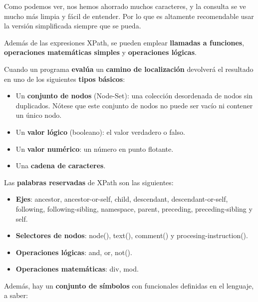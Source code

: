 Como podemos ver, nos hemos ahorrado muchos caracteres, y la consulta se ve mucho más limpia y fácil de entender. Por lo que es altamente recomendable usar la versión simplificada siempre que se pueda.

Además de las expresiones XPath, se pueden emplear \textbf{llamadas a funciones}, \textbf{operaciones matemáticas simples} y \textbf{operaciones lógicas}.

Cuando un programa \textbf{evalúa} un \textbf{camino de localización} devolverá el resultado en uno de los siguientes \textbf{tipos básicos}:

\begin{itemize}
    \item Un \textbf{conjunto de nodos} (Node-Set): una colección desordenada de nodos sin duplicados. Nótese que este conjunto de nodos no puede ser vacío ni contener un único nodo.
    \item Un \textbf{valor lógico} (booleano): el valor verdadero o falso.
    \item Un \textbf{valor numérico}: un número en punto flotante.
    \item Una \textbf{cadena de caracteres}.
\end{itemize}

Las \textbf{palabras reservadas} de XPath son las siguientes:

\begin{itemize}
    \item \textbf{Ejes}: ancestor, ancestor-or-self, child, descendant, descendant-or-self, following, following-sibling, namespace, parent, preceding, preceding-sibling y self.

    \item \textbf{Selectores de nodos}: node(), text(), comment() y procesing-instruction().
    \item \textbf{Operaciones lógicas}: and, or, not().
    \item \textbf{Operaciones matemáticas}: div, mod.
\end{itemize}

Además, hay un \textbf{conjunto de símbolos} con funcionales definidas en el lenguaje, a saber:

